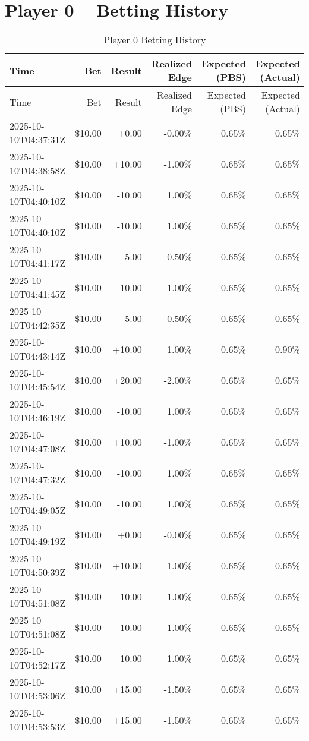 \documentclass[11pt]{article}
\begin{document}
\section*{Player 0 -- Betting History}
\begin{longtable}{l | r | r | r | r | r}
\caption{Player 0 Betting History}\label{tab:history\_p0}\\
\hline
Time & Bet & Result & Realized Edge & Expected (PBS) & Expected (Actual) \\ \hline
\endfirsthead
\hline
Time & Bet & Result & Realized Edge & Expected (PBS) & Expected (Actual) \\ \hline
\endhead
2025-10-10T04:37:31Z & \$10.00 & +0.00 & -0.00\% & 0.65\% & 0.65\% \\
2025-10-10T04:38:58Z & \$10.00 & +10.00 & -1.00\% & 0.65\% & 0.65\% \\
2025-10-10T04:40:10Z & \$10.00 & -10.00 & 1.00\% & 0.65\% & 0.65\% \\
2025-10-10T04:40:10Z & \$10.00 & -10.00 & 1.00\% & 0.65\% & 0.65\% \\
2025-10-10T04:41:17Z & \$10.00 & -5.00 & 0.50\% & 0.65\% & 0.65\% \\
2025-10-10T04:41:45Z & \$10.00 & -10.00 & 1.00\% & 0.65\% & 0.65\% \\
2025-10-10T04:42:35Z & \$10.00 & -5.00 & 0.50\% & 0.65\% & 0.65\% \\
2025-10-10T04:43:14Z & \$10.00 & +10.00 & -1.00\% & 0.65\% & 0.90\% \\
2025-10-10T04:45:54Z & \$10.00 & +20.00 & -2.00\% & 0.65\% & 0.65\% \\
2025-10-10T04:46:19Z & \$10.00 & -10.00 & 1.00\% & 0.65\% & 0.65\% \\
2025-10-10T04:47:08Z & \$10.00 & +10.00 & -1.00\% & 0.65\% & 0.65\% \\
2025-10-10T04:47:32Z & \$10.00 & -10.00 & 1.00\% & 0.65\% & 0.65\% \\
2025-10-10T04:49:05Z & \$10.00 & -10.00 & 1.00\% & 0.65\% & 0.65\% \\
2025-10-10T04:49:19Z & \$10.00 & +0.00 & -0.00\% & 0.65\% & 0.65\% \\
2025-10-10T04:50:39Z & \$10.00 & +10.00 & -1.00\% & 0.65\% & 0.65\% \\
2025-10-10T04:51:08Z & \$10.00 & -10.00 & 1.00\% & 0.65\% & 0.65\% \\
2025-10-10T04:51:08Z & \$10.00 & -10.00 & 1.00\% & 0.65\% & 0.65\% \\
2025-10-10T04:52:17Z & \$10.00 & -10.00 & 1.00\% & 0.65\% & 0.65\% \\
2025-10-10T04:53:06Z & \$10.00 & +15.00 & -1.50\% & 0.65\% & 0.65\% \\
2025-10-10T04:53:53Z & \$10.00 & +15.00 & -1.50\% & 0.65\% & 0.65\% \\
\hline
\end{longtable}
\end{document}
